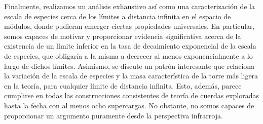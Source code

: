 Finalmente, realizamos un análisis exhaustivo así como una caracterización de la escala de especies cerca de los límites a distancia infinita en el espacio de módulos, donde pudieran emerger ciertas propiedades universales. En particular, somos capaces de motivar y proporcionar evidencia significativa acerca de la existencia de un límite inferior en la tasa de decaimiento exponencial de la escala de especies, que obligaría a la misma a decrecer al menos exponencialmente a lo largo de dichos límites. Asimismo, se discute un patrón interesante que relaciona la variación de la escala de especies y la masa característica de la torre más ligera en la teoría, para cualquier límite de distancia infinita. Esto, además, parece cumplirse en todas las construcciones consistentes de teoría de cuerdas exploradas hasta la fecha con al menos ocho supercargas. No obstante, no somos capaces de proporcionar un argumento puramente desde la perspectiva infrarroja. 

\newpage

 
 